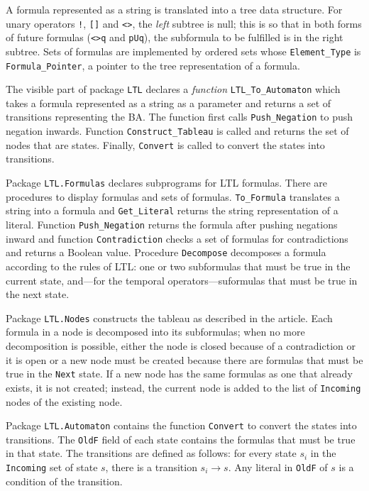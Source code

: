 \documentclass[11pt]{article}
\newcommand*{\p}[1]{\texttt{#1}}
\begin{document}
A formula represented as a string is translated into a tree data
structure. For unary operators \p{!}, \p{[]} and \p{<>}, the \emph{left}
subtree is null; this is so that in both forms of future formulas
(\p{<>q} and \p{pUq}), the subformula to be fulfilled is in the right
subtree. Sets of formulas are implemented by ordered sets whose
\p{Element\_Type} is \p{Formula\_Pointer}, a pointer to the tree
representation of a formula.

The visible part of package \p{LTL} declares a \emph{function}
\p{LTL\_To\_Automaton} which takes a formula represented as a string as
a parameter and returns a set of transitions representing the BA. The
function first calls \p{Push\_Negation} to push negation inwards.
Function \p{Construct\_Tableau} is called and returns the set of nodes
that are states. Finally, \p{Convert} is called to convert the states
into transitions.

Package \p{LTL.Formulas} declares subprograms for LTL
formulas. There are procedures to display formulas and sets of formulas.
\p{To\_Formula} translates a string into a formula and
\p{Get\_Literal} returns the string representation of a literal.
Function \p{Push\_Negation} returns the formula after pushing negations
inward and function \p{Contradiction} checks a set of formulas for
contradictions and returns a Boolean value. Procedure \p{Decompose}
decomposes a formula according to the rules of LTL:
one or two subformulas that must be true in the current state, and---for
the temporal operators---suformulas that must be true in the next state.

Package \p{LTL.Nodes} constructs the tableau as described in the
article. Each formula in a node is decomposed into its subformulas; when
no more decomposition is possible, either the node is closed because of
a contradiction or it is open or a new node must be created because
there are formulas that must be true in the \p{Next} state. If a new
node has the same formulas as one that already exists, it is not
created; instead, the current node is added to the list of \p{Incoming}
nodes of the existing node.

Package \p{LTL.Automaton} contains the function \p{Convert} to convert
the states into transitions. The \p{OldF} field of each state contains
the formulas that must be true in that state. The transitions are
defined as follows: for every state $s_{i}$ in the \p{Incoming} set of
state $s$, there is a transition $s_{i}\rightarrow s$. Any literal in
\p{OldF} of $s$ is a condition of the transition.
\end{document}
